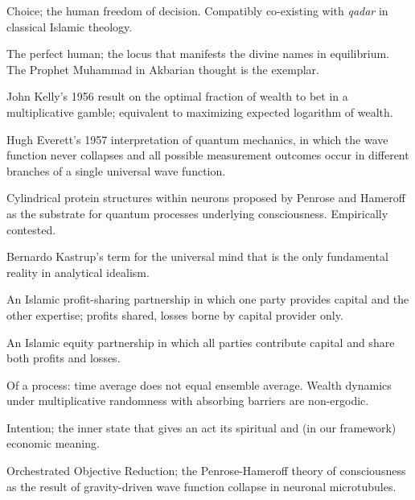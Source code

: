 \documentclass[11pt,a4paper]{book}
\theoremstyle{cleanrm}
\begin{document}
\begin{description}[leftmargin=3.5cm,style=nextline]
\item[\emph{Ikhtiyar}] Choice; the human freedom of decision.
Compatibly co-existing with \emph{qadar} in classical Islamic
theology.

\item[\emph{Insan al-kamil}] The perfect human; the locus that
manifests the divine names in equilibrium. The Prophet Muhammad in
Akbarian thought is the exemplar.

\item[Kelly criterion] John Kelly's 1956 result on the optimal
fraction of wealth to bet in a multiplicative gamble; equivalent to
maximizing expected logarithm of wealth.

\item[Many-Worlds Interpretation] Hugh Everett's 1957 interpretation
of quantum mechanics, in which the wave function never collapses and
all possible measurement outcomes occur in different branches of a
single universal wave function.

\item[Microtubules] Cylindrical protein structures within neurons
proposed by Penrose and Hameroff as the substrate for quantum
processes underlying consciousness. Empirically contested.

\item[Mind-at-Large] Bernardo Kastrup's term for the universal mind
that is the only fundamental reality in analytical idealism.

\item[\emph{Mudarabah}] An Islamic profit-sharing partnership in
which one party provides capital and the other expertise; profits
shared, losses borne by capital provider only.

\item[\emph{Musharakah}] An Islamic equity partnership in which all
parties contribute capital and share both profits and losses.

\item[Non-ergodic] Of a process: time average does not equal ensemble
average. Wealth dynamics under multiplicative randomness with
absorbing barriers are non-ergodic.

\item[\emph{Niyyah}] Intention; the inner state that gives an act its
spiritual and (in our framework) economic meaning.

\item[Orch-OR] Orchestrated Objective Reduction; the
Penrose-Hameroff theory of consciousness as the result of
gravity-driven wave function collapse in neuronal microtubules.


\end{description}
\end{document}

